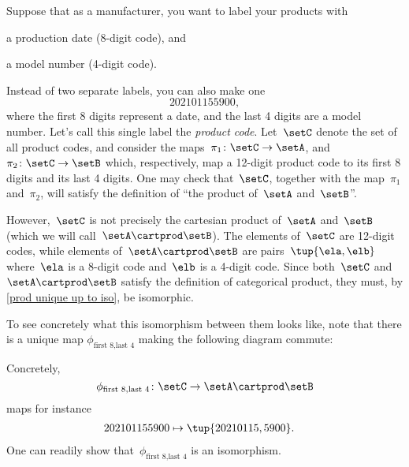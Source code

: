 \begin{example}
    \label{ex:univ-prop-prod}
    Suppose that as a manufacturer, you want to label your products with
    \begin{compactitem}
        \item a production date (8-digit code), and
        \item a model number (4-digit code).
    \end{compactitem}
    Instead of two separate labels, you can also make one
    \begin{equation}
        \label{eq:exa-prod-univ-prop-code}
        202101155900,
    \end{equation}
    where the first 8 digits represent a date, and the last 4 digits are a model number.
    Let's call this single label the \emph{product code}.
    Let~$\setC$ denote the set of all product codes, and consider the maps~$\pi_1\colon \setC\to \setA$, and~$\pi_2\colon \setC\to \setB$ which, respectively, map a 12-digit product code to its first 8 digits and its last 4 digits.
    One may check that~$\setC$, together with the map~$\pi_1$ and~$\pi_2$, will satisfy the definition of ``the product of~$\setA$ and~$\setB$''.

    \begin{center}
    \end{center}

    However,~$\setC$ is not precisely the cartesian product of~$\setA$ and~$\setB$ (which we will call~$\setA\cartprod \setB$).
    The elements of~$\setC$ are 12-digit codes, while elements of~$\setA\cartprod \setB$ are pairs~$\tup{\ela,\elb}$ where~$\ela$ is a 8-digit code and~$\elb$ is a 4-digit code.
    Since both~$\setC$ and~$\setA\cartprod \setB$ satisfy the definition of categorical product, they must, by \cref{prod unique up to iso}, be isomorphic.

    \begin{center}
    \end{center}

    To see concretely what this isomorphism between them looks like, note that there is a unique map $\phi_{\text{first 8},\text{last 4}}$ making the following diagram commute:

    \begin{center}
    \end{center}

    Concretely,~
    \begin{equation}
        \label{eq:exa-univ-iso}
        \phi_{\text{first 8},\text{last 4}}\colon \setC \to \setA\cartprod \setB
    \end{equation}
    maps for instance
    \begin{equation}
        \label{eq:exa-univ-iso-concrete}
        \begin{aligned}
            202101155900 & \mapsto \tup{20210115,5900}.
        \end{aligned}
    \end{equation}
    One can readily show that~$\phi_{\text{first 8},\text{last 4}}$ is an isomorphism.
\end{example}

